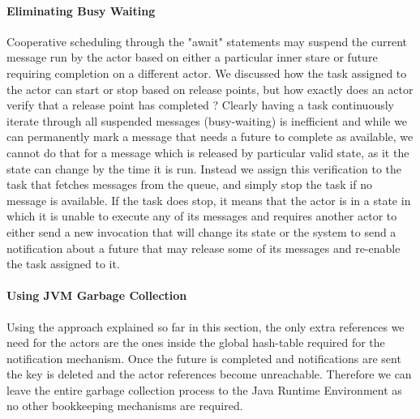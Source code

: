 \paragraph{Eliminating Busy Waiting}
Cooperative scheduling through the "await" statements may suspend the current message run by the actor based on either a particular inner stare or future requiring completion on a different actor. We discussed how the task assigned to the actor can start or stop based on release points, but how exactly does an actor verify that a release point has completed ? Clearly having a task continuously iterate through all suspended messages (busy-waiting) is inefficient and while we can permanently mark a message that needs a future to complete as available, we cannot do that for a message which is released by particular valid state, as it the state can change by the time it is run. Instead we assign this verification to the task that fetches messages from the queue, and simply stop the task if no message is available. If the task does stop, it means that the actor is in a state in which it is unable to execute any of its messages and requires another actor to either send a new invocation that will change its state or the system to send a notification about a future that may release some of its messages and re-enable the task assigned to it.  


\paragraph{Using JVM Garbage Collection}
Using the approach explained so far in this section, the only extra references we need for the actors are the ones inside the global hash-table required for the notification mechanism. Once the future is completed and notifications are sent the key is deleted and the actor references become unreachable. Therefore we can leave the entire garbage collection process to the Java Runtime Environment as no other bookkeeping mechanisms are required.

